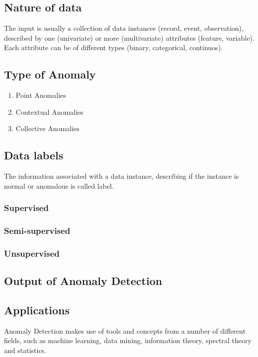 \subsection{Nature of data}

The input is usually a collection of data instances (record, event, observation), described by one (univariate) or more (multivariate) attributes (feature, variable). Each attribute can be of different types (binary, categorical, continuos).

\subsection{Type of Anomaly}

\begin{enumerate}
	\item Point Anomalies
	\item Contextual Anomalies
	\item Collective Anomalies
\end{enumerate}


\subsection{Data labels}

The information associated with a data instance, describing if the instance is normal or anomalous is called label.

\subsubsection{Supervised}
\subsubsection{Semi-supervised}
\subsubsection{Unsupervised}

\subsection{Output of Anomaly Detection}

\subsection{Applications}


Anomaly Detection makes use of tools and concepts from a number of different fields, such as machine learning, data mining, information theory, spectral theory and statistics.